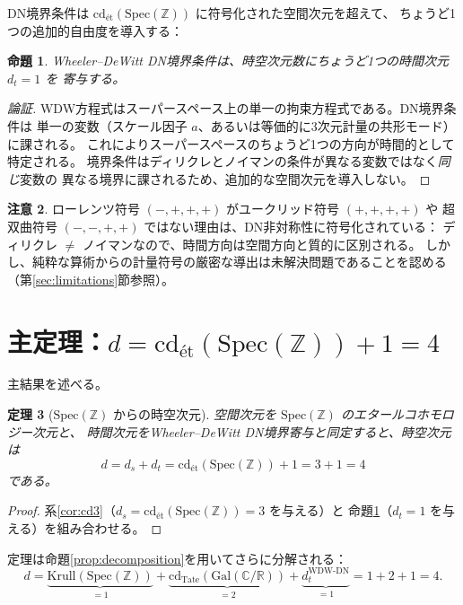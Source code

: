 \documentclass[12pt,a4paper]{article}
\newtheorem{theorem}{定理}[section]
\newtheorem{proposition}[theorem]{命題}
\theoremstyle{definition}
\newtheorem{remark}[theorem]{注意}
\newcommand{\Spec}{\mathrm{Spec}}
\newcommand{\Gal}{\mathrm{Gal}}
\newcommand{\cd}{\mathrm{cd}}
\newcommand{\Krull}{\mathrm{Krull}}
\newcommand{\ZZ}{\mathbb{Z}}
\newcommand{\RR}{\mathbb{R}}
\newcommand{\CC}{\mathbb{C}}
\begin{document}
DN境界条件は $\cd_{\text{\'et}}(\Spec(\ZZ))$ に符号化された空間次元を超えて、
ちょうど1つの追加的自由度を導入する：

\begin{proposition}\label{prop:temporal}
Wheeler--DeWitt DN境界条件は、時空次元数にちょうど1つの時間次元 $d_t = 1$ を
寄与する。
\end{proposition}

\begin{proof}[論証]
WDW方程式はスーパースペース上の単一の拘束方程式である。DN境界条件は
単一の変数（スケール因子 $a$、あるいは等価的に3次元計量の共形モード）に課される。
これによりスーパースペースのちょうど1つの方向が時間的として特定される。
境界条件はディリクレとノイマンの条件が異なる変数ではなく\emph{同じ}変数の
異なる境界に課されるため、追加的な空間次元を導入しない。
\end{proof}

\begin{remark}
ローレンツ符号 $(-, +, +, +)$ がユークリッド符号 $(+, +, +, +)$ や
超双曲符号 $(-, -, +, +)$ ではない理由は、DN非対称性に符号化されている：
ディリクレ $\neq$ ノイマンなので、時間方向は空間方向と質的に区別される。
しかし、純粋な算術からの計量符号の厳密な導出は未解決問題であることを認める
（第\ref{sec:limitations}節参照）。
\end{remark}

\section{主定理：$d = \cd_{\text{\'et}}(\Spec(\ZZ)) + 1 = 4$}\label{sec:main}

主結果を述べる。

\begin{theorem}[{$\Spec(\ZZ)$ からの時空次元}]\label{thm:main}
空間次元を $\Spec(\ZZ)$ のエタールコホモロジー次元と、
時間次元をWheeler--DeWitt DN境界寄与と同定すると、時空次元は
\[
  d = d_s + d_t = \cd_{\text{\'et}}(\Spec(\ZZ)) + 1 = 3 + 1 = 4
\]
である。
\end{theorem}

\begin{proof}
系\ref{cor:cd3}（$d_s = \cd_{\text{\'et}}(\Spec(\ZZ)) = 3$ を与える）と
命題\ref{prop:temporal}（$d_t = 1$ を与える）を組み合わせる。
\end{proof}

定理は命題\ref{prop:decomposition}を用いてさらに分解される：
\[
  d = \underbrace{\Krull(\Spec(\ZZ))}_{= 1} +
      \underbrace{\cd_{\mathrm{Tate}}(\Gal(\CC/\RR))}_{= 2} +
      \underbrace{d_t^{\text{WDW-DN}}}_{= 1} = 1 + 2 + 1 = 4.
\]
\end{document}
